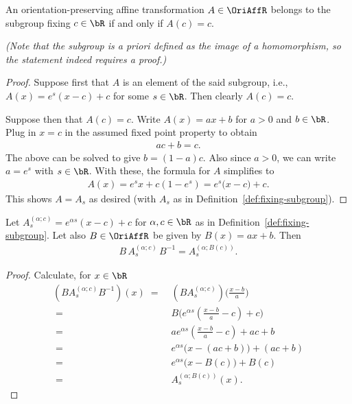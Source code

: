 \begin{lemma}
  \label{lem:fixing-subgroup-characterization}
  \leanok
  An orientation-preserving affine transformation $A \in \OriAffR$
  belongs to the subgroup fixing $c \in \bR$ if and only if $A(c) = c$.

  \emph{(Note that the subgroup is a priori defined as the image of a homomorphism,
  so the statement indeed requires a proof.)}
\end{lemma}
\begin{proof}
  Suppose first that $A$ is an element of the said subgroup, i.e.,
  $A(x) = e^{s} (x - c) + c$ for some $s \in \bR$. Then clearly $A(c) = c$.

  Suppose then that $A(c) = c$. Write $A(x) = a x + b$ for $a>0$ and $b \in \bR$.
  Plug in $x=c$ in the assumed fixed point property to obtain
  \begin{align*}
    a c + b = c .
  \end{align*}
  The above can be solved to give $b = (1-a)c$.
  Also since $a>0$, we can write $a = e^s$ with $s \in \bR$.
  With these, the formula for $A$ simplifies to
  \begin{align*}
    A(x) = e^s x + c (1 - e^s) = e^s \big( x - c \big) + c .
  \end{align*}
  This shows $A = A_s$ as desired (with $A_s$ as in Definition~\ref{def:fixing-subgroup}).
\end{proof}

\begin{lemma}
  \label{lem:conjugate-fixing}
  Let $A^{(\alpha;c)}_s = e^{\alpha s} (x - c) + c$ for $\alpha, c \in \bR$ as in
  Definition~\ref{def:fixing-subgroup}. Let
  also $B \in \OriAffR$ be given by $B(x) = a x + b$. Then
  \begin{align*}
    B \, A^{(\alpha;c)}_s \, B^{-1} = A^{(\alpha;B(c))}_{s} .
  \end{align*}
\end{lemma}
\begin{proof}
  Calculate, for $x \in \bR$
  \begin{align*}
    (B A^{(\alpha;c)}_s B^{-1})(x) \; = \; & (B A^{(\alpha;c)}_s)\big( \frac{x-b}{a} \big) \\
    \; = \; & B\big( e^{\alpha s} (\frac{x-b}{a} - c) + c \big) \\
    \; = \; & a e^{\alpha s} (\frac{x-b}{a} - c) + a c + b \\
    \; = \; & e^{\alpha s} \big( x - (a c + b) \big) + (a c + b) \\
    \; = \; & e^{\alpha s} \big( x - B(c) \big) + B(c) \\
    \; = \; & A^{(\alpha;B(c))}_s (x) .
  \end{align*}
\end{proof}



